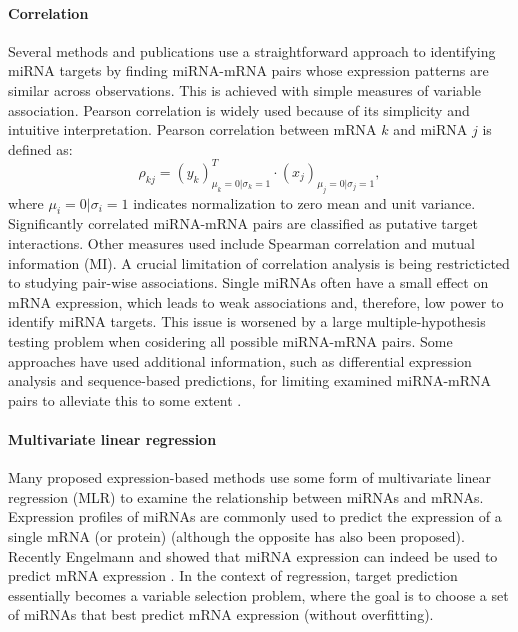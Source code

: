 \paragraph{Correlation}
Several methods and publications use a straightforward approach to identifying
miRNA targets by finding miRNA-mRNA pairs whose expression patterns are
similar across observations. This is achieved with simple measures of variable
association. Pearson correlation is widely used because of its simplicity
and intuitive interpretation. Pearson correlation between mRNA $k$ and miRNA
$j$ is defined as:
\begin{equation}
	\rho_{kj} = (y_k)_{\mu_k=0|\sigma_k=1}^T \cdot (x_j)_{\mu_j=0|\sigma_j=1},
	\label{eq:pearson}
\end{equation}
where $\mu_i=0|\sigma_i=1$ indicates normalization to zero mean and unit
variance. Significantly correlated miRNA-mRNA pairs are classified as putative
target interactions. Other measures used include Spearman correlation and
mutual information (MI). A crucial limitation of correlation analysis is being
restricticted to studying pair-wise associations. Single miRNAs often have a
small effect on mRNA expression, which leads to weak associations and,
therefore, low power to identify miRNA targets. This issue is worsened by a
large multiple-hypothesis testing problem when cosidering all possible miRNA-mRNA
pairs. Some approaches have used additional information, such as
differential expression analysis and sequence-based predictions, for limiting
examined miRNA-mRNA pairs to alleviate this to some extent
\citep{Muniategui2013}.

\paragraph{Multivariate linear regression}
Many proposed expression-based methods use some form of multivariate linear
regression (MLR) to examine the relationship between miRNAs and mRNAs.
Expression profiles of miRNAs are commonly used to predict the expression of a
single mRNA (or protein) (although the opposite has also been proposed).
Recently Engelmann and showed that miRNA expression can indeed be used to
predict mRNA expression \citep{Engelmann2012}. In the context of regression,
target prediction essentially becomes a variable selection problem, where the
goal is to choose a set of miRNAs that best predict mRNA expression (without
overfitting).


